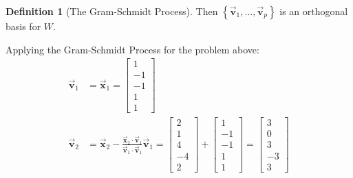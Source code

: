 \documentclass[letter,11pt]{article}
\theoremstyle{definition}
\newtheorem{definition}{Definition}[section]
\begin{document}
\begin{tcolorbox}[boxrule=1mm,enhanced jigsaw, breakable,before=\hfill,after=\hfill,adjusted title={Problem 5 solutions}]
\begin{definition}[The Gram-Schmidt Process]
Then $\left\{\vec{\boldsymbol{v}}_1, \ldots, \vec{\boldsymbol{v}}_p\right\}$ is an orthogonal basis for $W$.
\end{definition}
\tcblower
Applying the Gram-Schmidt Process for the problem above:
\begin{align*}
\vec{\boldsymbol{v}}_1 & = \vec{\boldsymbol{x}}_1 = \begin{bmatrix}1\\-1\\-1\\1\\1 \end{bmatrix}\\
\vec{\boldsymbol{v}}_2 & =\vec{\boldsymbol{x}}_2-\frac{\vec{\boldsymbol{x}}_2 \cdot \vec{\boldsymbol{v}}_1}{\vec{\boldsymbol{v}}_1 \cdot \vec{\boldsymbol{v}}_1} \vec{\boldsymbol{v}}_1 = \begin{bmatrix}2\\1\\4\\-4\\2 \end{bmatrix} + \begin{bmatrix}1\\-1\\-1\\1\\1 \end{bmatrix} = \begin{bmatrix}3\\0\\3\\-3\\3 \end{bmatrix}\\

\end{align*}
\end{tcolorbox}
\end{document}

